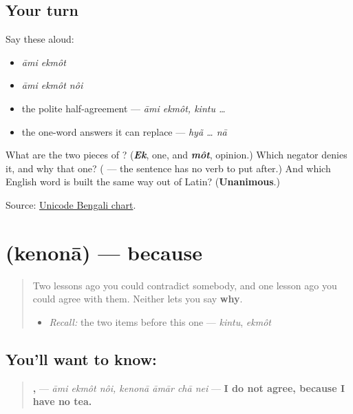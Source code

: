 \subsection*{Your turn}
Say these aloud:

\begin{itemize}
\raggedright
  \item \emph{āmi ekmôt}
  \item \emph{āmi ekmôt nôi}
  \item the polite half-agreement — \emph{āmi ekmôt, kintu …}
  \item the one-word answers it can replace — \emph{hyã … nā}
\end{itemize}

\begin{tcolorbox}[breakable,colback=teal!4,colframe=teal!35!black,title={Before you move on}]
What are the two pieces of \textbf{}? (\emph{\textbf{Ek}}, one, and \emph{\textbf{môt}}, opinion.) Which negator denies it, and why that one? (\textbf{} — the sentence has no verb to put \textbf{} after.) And which English word is built the same way out of Latin? (\textbf{Unanimous}.)

Source: \href{https://www.unicode.org/charts/PDF/U0980.pdf}{Unicode Bengali chart}.
\end{tcolorbox}
\section[\texorpdfstring{\bn{কেননা} (kenonā)}{কেননা (kenonā)}]{ (kenonā) — because}

\label{lesson:BN-C18-kenona}



\begin{quote}
Two lessons ago you could contradict somebody, and one lesson ago you could agree with them. Neither lets you say \textbf{why}.

\begin{itemize}
\raggedright
  \item \emph{Recall:} the two items before this one — \emph{kintu}, \emph{ekmôt}
\end{itemize}
\end{quote}

\subsection*{You'll want to know: }
\begin{quote}
\textbf{  ,    } — \emph{āmi ekmôt nôi, kenonā āmār chā nei} — \textbf{I do not agree, because I have no tea.}
\end{quote}

